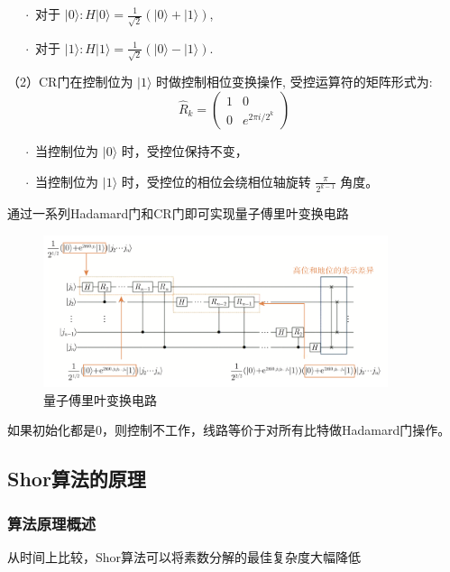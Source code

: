 \documentclass[12pt,hyperref,a4paper,UTF8]{ctexart}
\begin{document}
$\quad\;\cdot$ 对于 $|0\rangle: H|0\rangle=\frac{1}{\sqrt{2}}(|0\rangle+|1\rangle)$,

$\quad\;\cdot$ 对于 $|1\rangle: H|1\rangle=\frac{1}{\sqrt{2}}(|0\rangle-|1\rangle)$.
\newpage

（2）CR门在控制位为 $|1\rangle$ 时做控制相位变换操作, 受控运算符的矩阵形式为:
$$
\hat{R}_k=\left(\begin{array}{cc}
1 & 0 \\
0 & e^{2 \pi i / 2^k}
\end{array}\right)
$$

$\quad\;\cdot$ 当控制位为 $|0\rangle$ 时，受控位保持不变，

$\quad\;\cdot$ 当控制位为 $|1\rangle$ 时，受控位的相位会绕相位轴旋转 $\frac{\pi}{2^{k-1}}$ 角度。

\vskip 5pt
通过一系列Hadamard门和CR门即可实现量子傅里叶变换电路
\begin{figure}[!htbp]     
    \centering     
    \includegraphics[width =0.9\textwidth]{figures/量子傅里叶变换电路.png}     
    \caption{量子傅里叶变换电路}
\end{figure}

如果初始化都是0，则控制不工作，线路等价于对所有比特做Hadamard门操作。

\subsection{Shor算法的原理}
\subsubsection{算法原理概述}
从时间上比较，Shor算法可以将素数分解的最佳复杂度大幅降低
\end{document}
